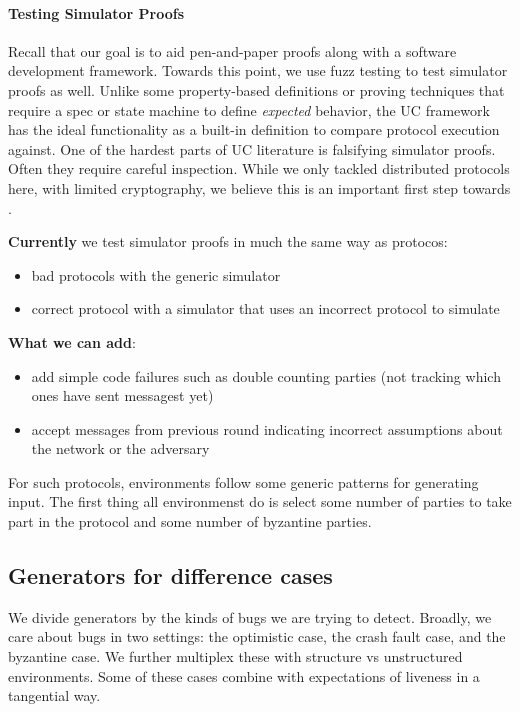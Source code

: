 \paragraph{Testing Simulator Proofs}
Recall that our goal is to aid pen-and-paper proofs along with a software development framework.
Towards this point, we use fuzz testing to test simulator proofs as well.
Unlike some property-based definitions or proving techniques that require a spec or state machine to define \emph{expected} behavior, the UC framework has the ideal functionality as a built-in definition to compare protocol execution against. 
One of the hardest parts of UC literature is falsifying simulator proofs. Often they require careful inspection.
While we only tackled distributed protocols here, with limited cryptography, we believe this is an important first step towards .

\textbf{Currently} we test simulator proofs in much the same way as protocos:
\begin{itemize}
    \item bad protocols with the generic simulator
    \item correct protocol with a simulator that uses an incorrect protocol to simulate
\end{itemize}

\textbf{What we can add}:
\begin{itemize}
    \item add simple code failures such as double counting parties (not tracking which ones have sent messagest yet)
    \item accept messages from previous round indicating incorrect assumptions about the network or the adversary
\end{itemize}

For such protocols, environments follow some generic patterns for generating input.
The first thing all environmenst do is select some number of parties to take part in the protocol and some number of byzantine parties. 

\subsection{Generators for difference cases}
We divide generators by the kinds of bugs we are trying to detect.
Broadly, we care about bugs in two settings: the optimistic case, the crash fault case, and the byzantine case.
We further multiplex these with structure vs unstructured environments. 
Some of these cases combine with expectations of liveness in a tangential way.
